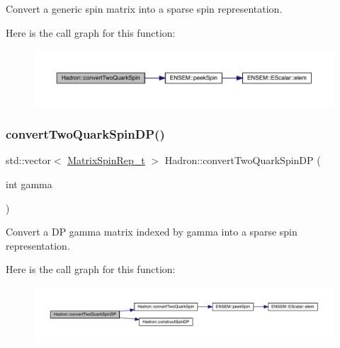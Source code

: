 Convert a generic spin matrix into a sparse spin representation. 

Here is the call graph for this function\+:\nopagebreak
\begin{figure}[H]
\begin{center}
\leavevmode
\includegraphics[width=350pt]{d1/daf/namespaceHadron_a6bcb90f42724a0f4ce09eeb64bd54c80_cgraph}
\end{center}
\end{figure}
\mbox{\label{namespaceHadron_a9d2555db4b8f920142f7c79e6752eccd}} 
\subsubsection{\texorpdfstring{convertTwoQuarkSpinDP()}{convertTwoQuarkSpinDP()}}
{\footnotesize\ttfamily std\+::vector$<$ \mbox{\hyperlink{structHadron_1_1MatrixSpinRep__t}{Matrix\+Spin\+Rep\+\_\+t}} $>$ Hadron\+::convert\+Two\+Quark\+Spin\+DP (\begin{DoxyParamCaption}\item[{int}]{gamma }\end{DoxyParamCaption})}



Convert a DP gamma matrix indexed by gamma into a sparse spin representation. 

Here is the call graph for this function\+:\nopagebreak
\begin{figure}[H]
\begin{center}
\leavevmode
\includegraphics[width=350pt]{d1/daf/namespaceHadron_a9d2555db4b8f920142f7c79e6752eccd_cgraph}
\end{center}
\end{figure}
\mbox{\label{namespaceHadron_aadefc7d519d40f16cb37c4df644944e7}} 
